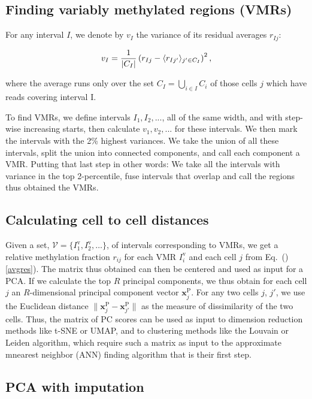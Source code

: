\documentclass[twocolumn,10pt]{article}
\begin{document}
\subsection{Finding variably methylated regions (VMRs)}

For any interval $I$, we denote by $v_I$ the variance of its residual averages $r_{Ij}$:

$$ v_I = \frac{\scriptsize{1}}{\scriptsize{|C_I|}}\left( r_{Ij} - \langle r_{Ij'}\rangle_{j'\in C_I} \right)^2,$$

where the average runs only over the set $C_I=\bigcup_{i\in I}C_i$ of those cells $j$ which have reads covering interval I.

To find VMRs, we define intervals $I_1, I_2, ...$, all of the same width, and with step-wise increasing starts, then calculate $v_1, v_2, ...$ for these intervals. We then mark the intervals with the 2\% highest variances. We take the union of all these intervals, split the union into connected components, and call each component a VMR. Putting that last step in other words: We take all the intervals with variance in the top 2-percentile, fuse intervals that overlap and call the regions thus obtained the VMRs.

\subsection{Calculating cell to cell distances}

Given a set, $\mathcal{V}=\{I^\text{v}_1,I^\text{v}_2,\dots\}$, of intervals corresponding to VMRs, we get a relative methylation fraction $r_{ij}$ for each VMR $I^\text{v}_i$ and each cell $j$ from Eq.\ ()\ref{avgres}). The matrix thus obtained can then be centered and used as input for a PCA. If we calculate the top $R$ principal components, we thus obtain for each cell $j$ an $R$-dimensional principal component vector $\mathbf{x}^\text{P}_j$. For any two cells $j$, $j'$, we use the Euclidean distance $\|\mathbf{x}^\text{P}_j - \mathbf{x}^\text{P}_{j'}\|$ as the measure of dissimilarity of the two cells.
Thus, the matrix of PC scores can be used as input to dimension reduction methods like t-SNE or UMAP, and to clustering methods like the Louvain or Leiden algorithm, which require such a matrix as input to the approximate mnearest neighbor (ANN) finding algorithm that is their first step.

\subsection{PCA with imputation}
\end{document}
